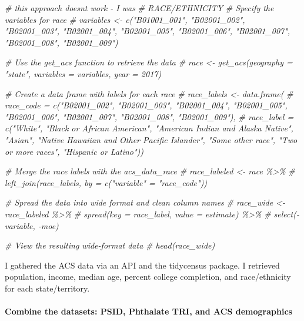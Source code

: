\documentclass[
]{article}
\newenvironment{Shaded}{\begin{snugshade}}{\end{snugshade}}
\newcommand{\CommentTok}[1]{\textcolor[rgb]{0.56,0.35,0.01}{\textit{#1}}}
\begin{document}
\begin{Shaded}
\begin{Highlighting}[]
\CommentTok{\# this approach doesn\textquotesingle{}t work {-} I was }
\CommentTok{\# RACE/ETHNICITY}
\CommentTok{\# Specify the variables for race}
\CommentTok{\# variables \textless{}{-} c("B01001\_001", "B02001\_002", "B02001\_003", "B02001\_004", "B02001\_005", "B02001\_006", "B02001\_007", "B02001\_008", "B02001\_009")}

\CommentTok{\# Use the get\_acs function to retrieve the data}
\CommentTok{\# race \textless{}{-} get\_acs(geography = "state", variables = variables, year = 2017)}

\CommentTok{\# Create a data frame with labels for each race}
\CommentTok{\# race\_labels \textless{}{-} data.frame(}
 \CommentTok{\# race\_code = c("B02001\_002", "B02001\_003", "B02001\_004", "B02001\_005", "B02001\_006", "B02001\_007", "B02001\_008", "B02001\_009"),}
 \CommentTok{\# race\_label = c("White", "Black or African American", "American Indian and Alaska Native", "Asian", "Native Hawaiian and Other Pacific Islander", "Some other race", "Two or more races", "Hispanic or Latino"))}

\CommentTok{\# Merge the race labels with the acs\_data\_race}
\CommentTok{\# race\_labeled \textless{}{-} race \%\textgreater{}\%}
 \CommentTok{\# left\_join(race\_labels, by = c("variable" = "race\_code"))}

\CommentTok{\# Spread the data into wide format and clean column names}
\CommentTok{\# race\_wide \textless{}{-} race\_labeled \%\textgreater{}\%}
 \CommentTok{\#  spread(key = race\_label, value = estimate) \%\textgreater{}\%}
 \CommentTok{\#  select({-}variable, {-}moe)}

\CommentTok{\# View the resulting wide{-}format data}
\CommentTok{\# head(race\_wide)}
\end{Highlighting}
\end{Shaded}

I gathered the ACS data via an API and the tidycensus package. I
retrieved population, income, median age, percent college completion,
and race/ethnicity for each state/territory.

\hypertarget{combine-the-datasets-psid-phthalate-tri-and-acs-demographics}{%
\paragraph{Combine the datasets: PSID, Phthalate TRI, and ACS
demographics}\label{combine-the-datasets-psid-phthalate-tri-and-acs-demographics}}
\end{document}
